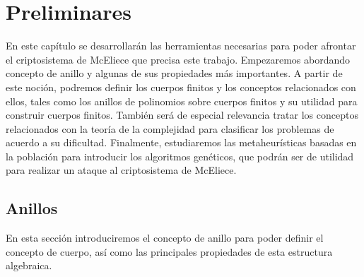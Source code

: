 
\chapter{Preliminares}

En este capítulo se desarrollarán las herramientas necesarias para poder afrontar el criptosistema de McEliece que precisa este trabajo. Empezaremos abordando concepto de anillo y algunas de sus propiedades más importantes. A partir de este noción, podremos definir los cuerpos finitos y los conceptos relacionados con ellos, tales como los anillos de polinomios sobre cuerpos finitos y su utilidad para construir cuerpos finitos. También será de especial relevancia tratar los conceptos relacionados con la teoría de la complejidad para clasificar los problemas de acuerdo a su dificultad. Finalmente, estudiaremos las metaheurísticas basadas en la población para introducir los algoritmos genéticos, que podrán ser de utilidad para realizar un ataque al criptosistema de McEliece.

\section{Anillos}
En esta sección introduciremos el concepto de anillo para poder definir el concepto de cuerpo, así como las principales propiedades de esta estructura algebraica.

